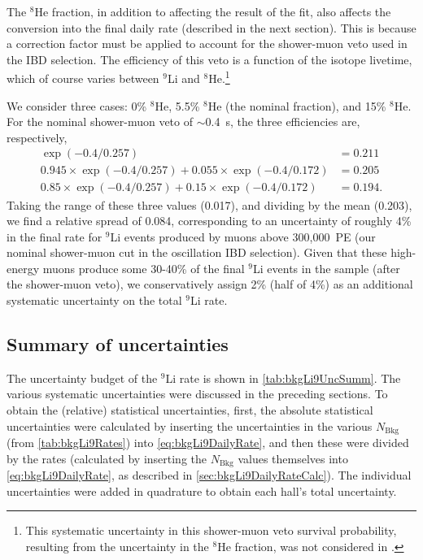 \documentclass[../thesis.tex]{subfiles}
\begin{document}
The $^8$He fraction, in addition to affecting the result of the fit, also affects the conversion into the final daily rate (described in the next section). This is because a correction factor must be applied to account for the shower-muon veto used in the IBD selection. The efficiency of this veto is a function of the isotope livetime, which of course varies between $^9$Li and $^8$He.\footnote{This systematic uncertainty in this shower-muon veto survival probability, resulting from the uncertainty in the $^8$He fraction, was not considered in \cite{ChrisLi9}.}

We consider three cases: 0\% $^8$He, 5.5\% $^8$He (the nominal fraction), and 15\% $^8$He. For the nominal shower-muon veto of $\sim$0.4~s, the three efficiencies are, respectively,
\begin{align*}
  \exp(-0.4/0.257) &= 0.211 \\
  0.945 \times \exp(-0.4/0.257) + 0.055 \times \exp(-0.4/0.172) &= 0.205 \\
  0.85 \times \exp(-0.4/0.257) + 0.15 \times \exp(-0.4/0.172) &= 0.194.
\end{align*}
Taking the range of these three values (0.017), and dividing by the mean (0.203), we find a relative spread of 0.084, corresponding to an uncertainty of roughly 4\% in the final rate for $^9$Li events produced by muons above 300,000~PE (our nominal shower-muon cut in the oscillation IBD selection). Given that these high-energy muons produce some 30-40\% of the final $^9$Li events in the sample (after the shower-muon veto), we conservatively assign 2\% (half of 4\%) as an additional systematic uncertainty on the total $^9$Li rate. %

\subsection{Summary of uncertainties}
\label{sec:bkgLi9UncSumm}

The uncertainty budget of the $^9$Li rate is shown in \autoref{tab:bkgLi9UncSumm}. The various systematic uncertainties were discussed in the preceding sections. To obtain the (relative) statistical uncertainties, first, the absolute statistical uncertainties were calculated by inserting the uncertainties in the various $N_{\mathrm{Bkg}}$ (from \autoref{tab:bkgLi9Rates}) into \autoref{eq:bkgLi9DailyRate}, and then these were divided by the rates (calculated by inserting the $N_{\mathrm{Bkg}}$ values themselves into \autoref{eq:bkgLi9DailyRate}, as described in \autoref{sec:bkgLi9DailyRateCalc}). The individual uncertainties were added in quadrature to obtain each hall's total uncertainty.
\end{document}
